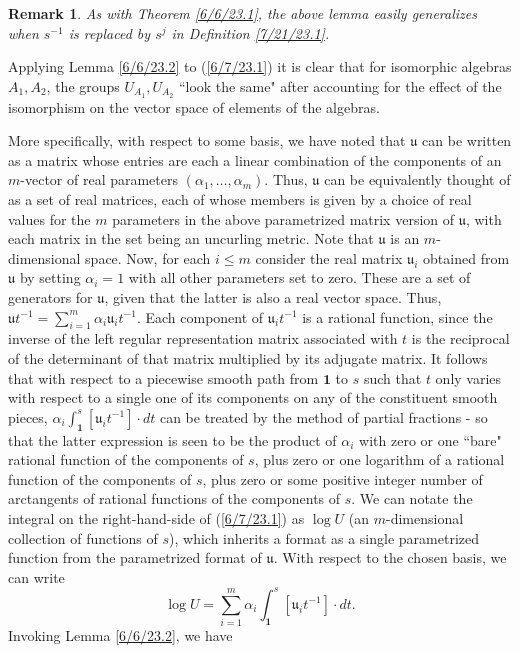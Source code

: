 \documentclass{amsart}
\numberwithin{equation}{section}
\newtheorem{remark}[theorem]{Remark}
\theoremstyle{definition}
\numberwithin{theorem}{section}
\begin{document}
\begin{remark} {\rm As with Theorem \ref{6/6/23.1}, the above lemma easily generalizes when $s^{-1}$ is replaced by $s^{j}$ in Definition \ref{7/21/23.1}.}\end{remark}

Applying Lemma \ref{6/6/23.2} to (\ref{6/7/23.1}) it is clear that for isomorphic algebras $A_1,A_2$, the groups $ U_{A_1},  U_{A_2}$ ``look the same" after accounting for the effect of the isomorphism on the vector space of elements of the algebras.

More specifically, with respect to some basis, we have noted that $\mathfrak{u}$ can be written as a matrix whose entries are each a linear combination of the components of an $m$-vector of real parameters $(\alpha_1, \dots, \alpha_m)$.   Thus, $\mathfrak{u}$ can be equivalently thought of as a set of real matrices, each of whose members is given by a choice of real values for the $m$ parameters in the above parametrized matrix version of $\mathfrak{u}$, with each matrix in the set being an uncurling metric.   Note that $\mathfrak{u}$ is an $m$-dimensional space.    Now, for each $i\le m$ consider the real matrix  $\mathfrak{u}_i$ obtained from $\mathfrak{u}$ by setting $\alpha_i =1$ with all other parameters set to zero.  These are a set of generators for $\mathfrak{u}$, given that the latter is also a real vector space. Thus, $\mathfrak{u}t^{-1} = \sum_{i=1}^m \alpha_i \mathfrak{u}_i t^{-1}$.   Each component of $\mathfrak{u}_i t^{-1}$ is a rational function, since the inverse of the left regular representation matrix associated with $t$ is the reciprocal of the determinant of that matrix multiplied by its adjugate matrix.  It follows that  with respect to a piecewise smooth path from $\mathbf{1}$ to $s$ such that $t$ only varies with respect to a single one of its components on any of the constituent smooth pieces, $\alpha_i \int_{\mathbf{1}}^s [\mathfrak{u}_i t^{-1}]\cdot dt$ can be treated by the method of partial fractions - so that the latter expression is seen to be the product of $\alpha_i$ with zero or one ``bare" rational function of the components of $s$, plus zero or one logarithm of a rational function of the components of $s$, plus zero or some positive integer number of arctangents of rational functions of the components of $s$.  We can notate the integral on the right-hand-side of (\ref{6/7/23.1}) as $\log  U$ (an $m$-dimensional collection of functions of $s$), which inherits a format as a single parametrized function from the parametrized format of $\mathfrak{u}$.  With respect to the chosen basis, we can write \begin{equation}\label{9/26/23.1} \log  U =\sum_{i=1}^m \alpha_i \int_{\mathbf{1}}^s [\mathfrak{u}_i t^{-1}]\cdot dt.\end{equation}  Invoking Lemma \ref{6/6/23.2}, we have
\end{document}
